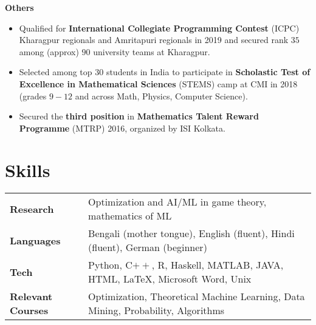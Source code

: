 \vspace{\gap}
\resumeProjectHeading
{\textbf{Others}}
{}
{
\item 
\begin{itemize}[itemsep=-4pt, parsep=5pt, leftmargin=0.5cm]
\item {}  Qualified for \textbf{International Collegiate Programming Contest} (ICPC) Kharagpur regionals and Amritapuri regionals in 2019 and secured rank $35$ among (approx) $90$ university teams at Kharagpur.
\item Selected among top $30$ students in India to participate in \textbf{Scholastic Test of Excellence in Mathematical Sciences} (STEMS) camp at CMI in 2018 (grades $9-12$ and across Math, Physics, Computer Science).
\item Secured the \textbf{third position} in \textbf{Mathematics Talent Reward Programme} (MTRP) 2016, organized by ISI Kolkata.\end{itemize}}
\resumeSubHeadingListEnd
\vspace{\mygap}


\section{Skills}
\vspace{-2pt}
\begin{tabular*}{\textwidth}{l @{\hskip 0.5in} l}
\textbf{Research} & Optimization and AI/ML in game theory, mathematics of ML\\
\textbf{Languages} & Bengali (mother tongue), English (fluent), Hindi (fluent), German (beginner)\\
\textbf{Tech}  & {Python, C$++$, R, Haskell,  MATLAB, JAVA, HTML, \LaTeX, Microsoft Word, Unix} \\
\textbf{Relevant Courses}
  & {Optimization, Theoretical Machine Learning, Data Mining, Probability, Algorithms} \\
\end{tabular*}
\vspace{\gap}







